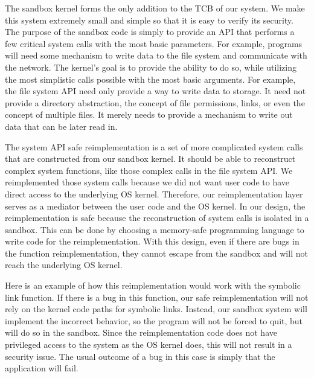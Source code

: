 The sandbox kernel forms the only addition to the TCB of our system.  We 
make this system extremely small and simple so that it is easy to verify its 
security.  The purpose of the sandbox code is simply to provide an API that performs
a few critical system calls with the most basic parameters.  For example,
programs will need some mechanism to write data to the file system
and communicate with the network.  The kernel's goal is to provide the ability
to do so, while utilizing the most simplistic calls possible with the most
basic arguments.  For example, the file system API need only provide a way
to write data to storage.  It need not provide a directory abstraction, the
concept of file permissions, links, or even the concept of multiple files.
It merely needs to provide a mechanism to write out data that can be later
read in.  


The system API safe reimplementation is a set of more complicated system calls 
that are constructed from our sandbox kernel. It should be able to reconstruct 
complex system functions, like those complex calls in the file system API. 
We reimplemented those system calls because we did not want user code 
to have direct access to the underlying OS kernel. 
Therefore, our reimplementation layer serves as a mediator between the user code 
and the OS kernel. In our design, the reimplementation is safe 
because the reconstruction of system calls is isolated in a sandbox. 
This can be done by choosing a memory-safe programming language to write code for the reimplementation. 
With this design, even if there are bugs in the function reimplementation, 
they cannot escape from the sandbox and will not reach the underlying OS kernel. 

Here is an example of how this reimplementation would work with the symbolic link function. 
If there is a bug in this function, our safe reimplementation will not rely on the kernel code paths for symbolic links. 
Instead, our sandbox system will implement the incorrect behavior, so the program will not be forced to quit, but will do so in the sandbox. 
Since the reimplementation code does not have privileged access to the system as the OS kernel does, 
this will not result in a security issue. The usual outcome of a bug in this case is simply that the application will fail.

